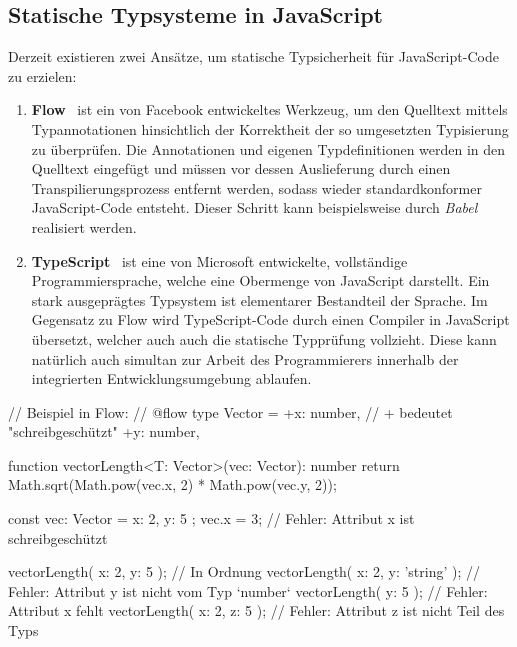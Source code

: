 \subsection{Statische Typsysteme in JavaScript}

Derzeit existieren zwei Ansätze, um statische Typsicherheit für JavaScript-Code zu erzielen:

\begin{enumerate}
    \item \textbf{Flow}~\autocite{flow} ist ein von Facebook entwickeltes Werkzeug, um den Quelltext mittels Typannotationen hinsichtlich der Korrektheit der so umgesetzten Typisierung zu überprüfen. Die Annotationen und eigenen Typdefinitionen werden in den Quelltext eingefügt und müssen vor dessen Auslieferung durch einen Transpilierungsprozess entfernt werden, sodass wieder standardkonformer JavaScript-Code entsteht. Dieser Schritt kann beispielsweise durch \emph{Babel}~\autocite{babel} realisiert werden.

    \item \textbf{TypeScript}~\autocite{typescript} ist eine von Microsoft entwickelte, vollständige Programmiersprache, welche eine Obermenge von JavaScript darstellt. Ein stark ausgeprägtes Typsystem ist elementarer Bestandteil der Sprache. Im Gegensatz zu Flow wird TypeScript-Code durch einen Compiler in JavaScript übersetzt, welcher auch auch die statische Typprüfung vollzieht. Diese kann natürlich auch simultan zur Arbeit des Programmierers innerhalb der integrierten Entwicklungsumgebung ablaufen.
\end{enumerate}

\bigskip
\begin{listing}[!h]
\begin{jscode}
// Beispiel in Flow:
// @flow
type Vector = {
  +x: number,                           // + bedeutet "schreibgeschützt"
  +y: number,
}

function vectorLength<T: Vector>(vec: Vector): number {
  return Math.sqrt(Math.pow(vec.x, 2) * Math.pow(vec.y, 2));
}

const vec: Vector = { x: 2, y: 5 };
vec.x = 3;                              // Fehler: Attribut x ist schreibgeschützt

vectorLength({ x: 2, y: 5 });           // In Ordnung
vectorLength({ x: 2, y: 'string' });    // Fehler: Attribut y ist nicht vom Typ `number`
vectorLength({ y: 5 });                 // Fehler: Attribut x fehlt
vectorLength({ x: 2, z: 5 });           // Fehler: Attribut z ist nicht Teil des Typs
\end{jscode}
\end{listing}

